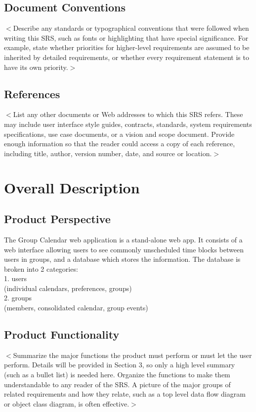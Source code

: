 \documentclass{scrreprt}
\begin{document}
\section{Document Conventions}
$<$Describe any standards or typographical conventions that were followed when
writing this SRS, such as fonts or highlighting that have special significance.
For example, state whether priorities  for higher-level requirements are assumed
to be inherited by detailed requirements, or whether every requirement statement
is to have its own priority.$>$


\section{References}
$<$List any other documents or Web addresses to which this SRS refers. These may
include user interface style guides, contracts, standards, system requirements
specifications, use case documents, or a vision and scope document. Provide
enough information so that the reader could access a copy of each reference,
including title, author, version number, date, and source or location.$>$


\chapter{Overall Description}

\section{Product Perspective}
The Group Calendar web application is a stand-alone web app. It consists of a web interface allowing users to see commonly unscheduled time blocks between users in groups, and a database which stores the information. The database is broken into 2 categories:
\\1. users
\\  (individual calendars, preferences, groups)
\\2. groups
\\  (members, consolidated calendar, group events)

\section{Product Functionality}
$<$Summarize the major functions the product must perform or must let the user
perform. Details will be provided in Section 3, so only a high level summary
(such as a bullet list) is needed here. Organize the functions to make them
understandable to any reader of the SRS. A picture of the major groups of
related requirements and how they relate, such as a top level data flow diagram
or object class diagram, is often effective.$>$
\end{document}
